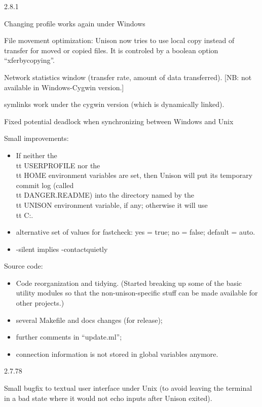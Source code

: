 \begin{changesfromversion}{2.8.1}
\item Changing profile works again under Windows
\item File movement optimization: Unison now tries to use local copy instead of
  transfer for moved or copied files.  It is controled by a boolean option
  ``xferbycopying''.
\item Network statistics window (transfer rate, amount of data transferred).
      [NB: not available in Windows-Cygwin version.]
\item symlinks work under the cygwin version (which is dynamically linked).
\item Fixed potential deadlock when synchronizing between Windows and
Unix 
\item Small improvements:
  \begin{itemize} 
  \item If neither the {\\tt USERPROFILE} nor the {\\tt HOME} environment
    variables are set, then Unison will put its temporary commit log
    (called {\\tt DANGER.README}) into the directory named by the 
    {\\tt UNISON} environment variable, if any; otherwise it will use
    {\\tt C:}.
  \item alternative set of values for fastcheck: yes = true; no = false;
  default = auto.
  \item -silent implies -contactquietly
  \end{itemize}
\item Source code:
  \begin{itemize}
  \item Code reorganization and tidying.  (Started breaking up some of the
    basic utility modules so that the non-unison-specific stuff can be
    made available for other projects.)
  \item several Makefile and docs changes (for release);
  \item further comments in ``update.ml'';
  \item connection information is not stored in global variables anymore.
  \end{itemize}
\end{changesfromversion}

\begin{changesfromversion}{2.7.78}
\item Small bugfix to textual user interface under Unix (to avoid leaving
  the terminal in a bad state where it would not echo inputs after Unison
  exited).
\end{changesfromversion}

